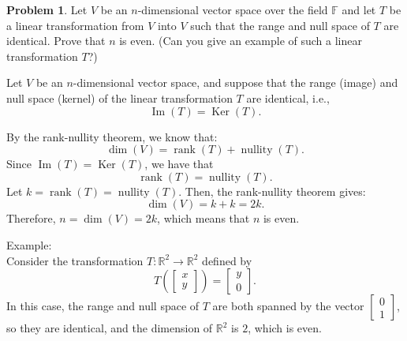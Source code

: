 \documentclass[12pt]{article}
\theoremstyle{definition}
\newtheorem{problem}{Problem}
\begin{document}
\begin{problem}
    Let $V$ be an $n$-dimensional vector space over the field $\mathbb{F}$ and let $T$ be a linear
    transformation from $V$ into $V$ such that the range and null space of $T$ are identical. Prove that $n$ is even.
    (Can you give an example of such a linear transformation $T$?)
    \begin{solution}

        Let $V$ be an $n$-dimensional vector space, and suppose that the range (image) and null space (kernel) of the linear transformation $T$ are identical, i.e., 
        \[
        \operatorname{Im}(T) = \operatorname{Ker}(T).
        \]

        By the rank-nullity theorem, we know that:
        \[
        \dim(V) = \operatorname{rank}(T) + \operatorname{nullity}(T).
        \]
        Since $\operatorname{Im}(T) = \operatorname{Ker}(T)$, we have that 
        \[
        \operatorname{rank}(T) = \operatorname{nullity}(T).
        \]
        Let \(k = \operatorname{rank}(T) = \operatorname{nullity}(T)\). Then, the rank-nullity theorem gives:
        \[
        \dim(V) = k + k = 2k.
        \]
        Therefore, \(n = \dim(V) = 2k\), which means that \(n\) is even.

        Example:\\
        Consider the transformation $T: \mathbb{R}^2 \to \mathbb{R}^2$ defined by
        \[
        T\left( \begin{bmatrix} x \\ y \end{bmatrix} \right) = \begin{bmatrix} y \\ 0 \end{bmatrix}.
        \]
        In this case, the range and null space of \(T\) are both spanned by the vector \(\begin{bmatrix} 0 \\ 1 \end{bmatrix}\), so they are identical, and the dimension of \(\mathbb{R}^2\) is \(2\), which is even.
    \end{solution}
\end{problem}
\end{document}
